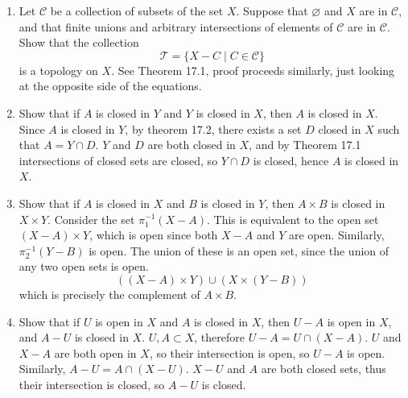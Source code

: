 \documentclass[12pt,letterpaper]{article}
\newcommand{\n}{\break}
\let\emptyset\varnothing
\newcommand{\T}{\ensuremath{\mathcal{T}}}
\begin{document}
\RaggedRight
\begin{enumerate}
  \item Let $\mathcal{C}$ be a collection of subsets of the set $X$. Suppose that $\emptyset$ and $X$ are in $\mathcal{C}$, and that finite unions and arbitrary intersections of elements of $\mathcal{C}$ are in $\mathcal{C}$. Show that the collection $$\T = \{X-C\; |\; C\in\mathcal{C}\}$$ is a topology on $X$.\n
  \indent See Theorem 17.1, proof proceeds similarly, just looking at the opposite side of the equations.
  \item Show that if $A$ is closed in $Y$ and $Y$ is closed in $X$, then $A$ is closed in $X$.\n
  \indent Since $A$ is closed in $Y$, by theorem 17.2, there exists a set $D$ closed in $X$ such that $A=Y\cap D$.
  $Y$ and $D$ are both closed in $X$, and by Theorem 17.1 intersections of closed sets are closed, so $Y\cap D$ is closed, hence $A$ is closed in $X$.
  \item Show that if $A$ is closed in $X$ and $B$ is closed in $Y$, then $A\times B$ is closed in $X\times Y$.\n
  \indent Consider the set $\pi_1^{-1}(X-A)$. This is equivalent to the open set $(X-A)\times Y$, which is open since both $X-A$ and $Y$ are open. Similarly, $\pi_2^{-1}(Y-B)$ is open. The union of these is an open set, since the union of any two open sets is open.
  $$((X-A)\times Y)\cup (X\times (Y-B))$$
  which is precisely the complement of $A\times B$.
  \item Show that if $U$ is open in $X$ and $A$ is closed in $X$, then $U-A$ is open in $X$, and $A-U$ is closed in $X$.\n
  \indent $U,A\subset X$, therefore $U-A = U\cap(X-A)$. $U$ and $X-A$ are both open in $X$, so their intersection is open, so $U-A$ is open.\n
  Similarly, $A-U=A\cap (X-U)$. $X-U$ and $A$ are both closed sets, thus their intersection is closed, so $A-U$ is closed.
\end{enumerate}
\end{document}
